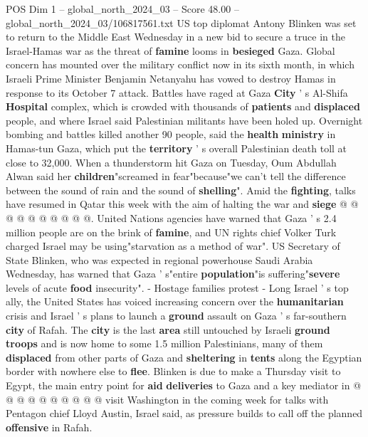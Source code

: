 \begin{textsample}{POS Dim 1 – global\_north\_2024\_03 – Score 48.00 – global\_north\_2024\_03/106817561.txt}  \label{ex:f1_pos_057}
US top diplomat Antony Blinken was set to return to the Middle East Wednesday in a new bid to secure a truce in the Israel-Hamas war as the threat of \textbf{famine} looms in \textbf{besieged} Gaza.
Global concern has mounted over the military conflict now in its sixth month, in which Israeli Prime Minister Benjamin Netanyahu has vowed to destroy Hamas in response to its October 7 attack.
Battles have raged at Gaza \textbf{City} ' s Al-Shifa \textbf{Hospital} complex, which is crowded with thousands of \textbf{patients} and \textbf{displaced} people, and where Israel said Palestinian militants have been holed up.
Overnight bombing and battles killed another 90 people, said the \textbf{health} \textbf{ministry} in Hamas-tun Gaza, which put the \textbf{territory} ' s overall Palestinian death toll at close to 32,000.
When a thunderstorm hit Gaza on Tuesday, Oum Abdullah Alwan said her \textbf{children}"screamed in fear"because"we can't tell the difference between the sound of rain and the sound of \textbf{shelling}".
Amid the \textbf{fighting}, talks have resumed in Qatar this week with the aim of halting the war and \textbf{siege} @ @ @ @ @ @ @ @ @ @.
United Nations agencies have warned that Gaza ' s 2.4 million people are on the brink of \textbf{famine}, and UN rights chief Volker Turk charged Israel may be using"starvation as a method of war".
US Secretary of State Blinken, who was expected in regional powerhouse Saudi Arabia Wednesday, has warned that Gaza ' s"entire \textbf{population}"is suffering"\textbf{severe} levels of acute \textbf{food} insecurity". - Hostage families protest - Long Israel ' s top ally, the United States has voiced increasing concern over the \textbf{humanitarian} crisis and Israel ' s plans to launch a \textbf{ground} assault on Gaza ' s far-southern \textbf{city} of Rafah.
The \textbf{city} is the last \textbf{area} still untouched by Israeli \textbf{ground} \textbf{troops} and is now home to some 1.5 million Palestinians, many of them \textbf{displaced} from other parts of Gaza and \textbf{sheltering} in \textbf{tents} along the Egyptian border with nowhere else to \textbf{flee}.
Blinken is due to make a Thursday visit to Egypt, the main entry point for \textbf{aid} \textbf{deliveries} to Gaza and a key mediator in @ @ @ @ @ @ @ @ @ @ visit Washington in the coming week for talks with Pentagon chief Lloyd Austin, Israel said, as pressure builds to call off the planned \textbf{offensive} in Rafah.

\end{textsample}
